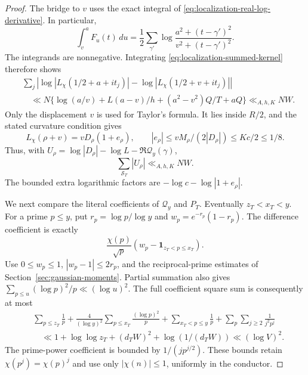\begin{proof}
The bridge to $v$ uses the exact integral of
\eqref{eq:localization-real-log-derivative}. In particular,
\[
 \int_v^aF_u(t)\,du
 =\frac12\sum_{\gamma'}
       \log\frac{a^2+(t-\gamma')^2}{v^2+(t-\gamma')^2}.
\]
The integrands are nonnegative. Integrating
\eqref{eq:localization-summed-kernel} therefore shows
\begin{align*}
 &\sum_j\left|\log|L_\chi(1/2+a+it_j)|
                  -\log|L_\chi(1/2+v+it_j)|\right|\\
 &\quad\ll N\{\log(a/v)+L(a-v)/h+(a^2-v^2)Q/T+aQ\}
            \ll_{A,h,K}NW.
\end{align*}
Only the displacement $v$ is used for Taylor's formula. It lies
inside $R/2$, and the stated curvature condition gives
\[
 L_\chi(\rho+v)=vD_\rho(1+e_\rho),\qquad
 |e_\rho|\le vM_\rho/(2|D_\rho|)\le Kc/2\le1/8.
\]
Thus, with
$U_\rho=\log|D_\rho|-\log L-\Re\mathcal Q_y(\gamma)$,
\begin{equation}\label{eq:localization-derivative-log-mean}
             \sum_{\mathcal S_T}|U_\rho|\ll_{A,h,K}NW.
\end{equation}
The bounded extra logarithmic factors are
$-\log c-\log|1+e_\rho|$.

We next compare the literal coefficients of $\mathcal Q_y$ and
$P_T$. Eventually $z_T<x_T<y$. For a prime $p\le y$, put
$r_p=\log p/\log y$ and $w_p=e^{-r_p}(1-r_p)$. The difference
coefficient is exactly
\[
 \frac{\chi(p)}{\sqrt p}
       (w_p-\mathbf1_{z_T<p\le x_T}).
\]
Use $0\le w_p\le1$, $|w_p-1|\le2r_p$, and the
reciprocal-prime estimates of Section~\ref{sec:gaussian-moments}.
Partial summation also gives
$\sum_{p\le u}(\log p)^2/p\ll(\log u)^2$.
The full coefficient square sum is consequently at most
\begin{align*}
 &\sum_{p\le z_T}\frac1p
 +\frac4{(\log y)^2}\sum_{p\le x_T}\frac{(\log p)^2}p
 +\sum_{x_T<p\le y}\frac1p
 +\sum_p\sum_{j\ge2}\frac1{j^2p^j}\\
 &\quad\ll 1+\log\log z_T+(d_TW)^2+\log(1/(d_TW))
       \ll(\log V)^2.
\end{align*}
The prime-power coefficient is bounded by $1/(jp^{j/2})$.
These bounds retain $\chi(p^j)=\chi(p)^j$ and use only
$|\chi(n)|\le1$, uniformly in the conductor.


\end{proof}

